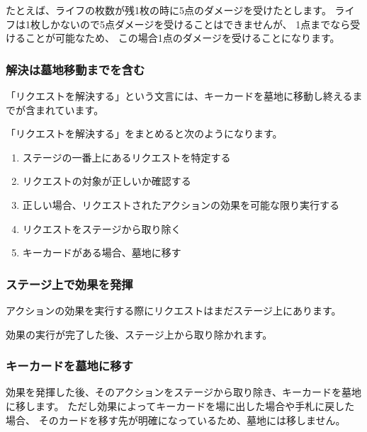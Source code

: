 \documentclass[letterpaper,10pt,dvipdfmx]{sphinxmanual}
\begin{document}
\sphinxAtStartPar
たとえば、ライフの枚数が残1枚の時に5点のダメージを受けたとします。
ライフは1枚しかないので5点ダメージを受けることはできませんが、
1点までなら受けることが可能なため、
この場合1点のダメージを受けることになります。


\subsubsection{解決は墓地移動までを含む}
\label{\detokenize{common/common:id31}}
\sphinxAtStartPar
「リクエストを解決する」という文言には、キーカードを墓地に移動し終えるまでが含まれています。

\sphinxAtStartPar
「リクエストを解決する」をまとめると次のようになります。
\begin{enumerate}
%
\item {} 
\sphinxAtStartPar
ステージの一番上にあるリクエストを特定する

\item {} 
\sphinxAtStartPar
リクエストの対象が正しいか確認する

\item {} 
\sphinxAtStartPar
正しい場合、リクエストされたアクションの効果を可能な限り実行する

\item {} 
\sphinxAtStartPar
リクエストをステージから取り除く

\item {} 
\sphinxAtStartPar
キーカードがある場合、墓地に移す

\end{enumerate}


\subsubsection{ステージ上で効果を発揮}
\label{\detokenize{common/common:id32}}
\sphinxAtStartPar
アクションの効果を実行する際にリクエストはまだステージ上にあります。

\sphinxAtStartPar
効果の実行が完了した後、ステージ上から取り除かれます。


\subsubsection{キーカードを墓地に移す}
\label{\detokenize{common/common:keycard-gy}}\label{\detokenize{common/common:id33}}
\sphinxAtStartPar
効果を発揮した後、そのアクションをステージから取り除き、キーカードを墓地に移します。
ただし効果によってキーカードを場に出した場合や手札に戻した場合、
そのカードを移す先が明確になっているため、墓地には移しません。
\end{document}
